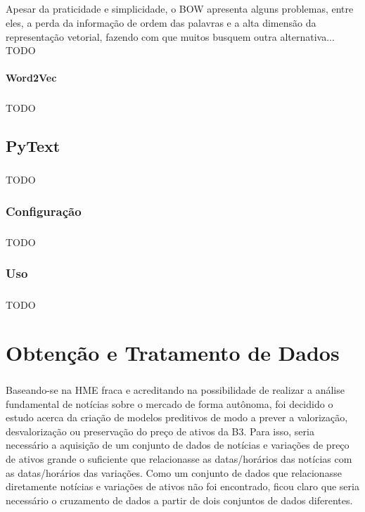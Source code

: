 \documentclass[grad,numbers]{coppe}
\begin{document}
  		\paragraph{}Apesar da praticidade e simplicidade, o BOW apresenta alguns problemas, entre eles, a perda da informação de ordem das palavras e a alta dimensão da representação vetorial, fazendo com que muitos busquem outra alternativa... TODO
  		\subsubsection{Word2Vec}
  			\paragraph{}TODO
	  	
  
  
  \section{PyText}
  	\paragraph{}TODO
  	\subsection{Configuração}
  		\paragraph{}TODO
  	\subsection{Uso}
  		\paragraph{}TODO
  
  \chapter{Obtenção e Tratamento de Dados}
  	\paragraph{}Baseando-se na HME fraca e acreditando na possibilidade de realizar a análise fundamental de notícias sobre o mercado de forma autônoma, foi decidido o estudo acerca da criação de modelos preditivos de modo a prever a valorização, desvalorização ou preservação do preço de ativos da B3. Para isso, seria necessário a aquisição de um conjunto de dados de notícias e variações de preço de ativos grande o suficiente que relacionasse as datas/horários das notícias com as datas/horários das variações. Como um conjunto de dados que relacionasse diretamente notícias e variações de ativos não foi encontrado, ficou claro que seria necessário o cruzamento de dados a partir de dois conjuntos de dados diferentes.
\end{document}
